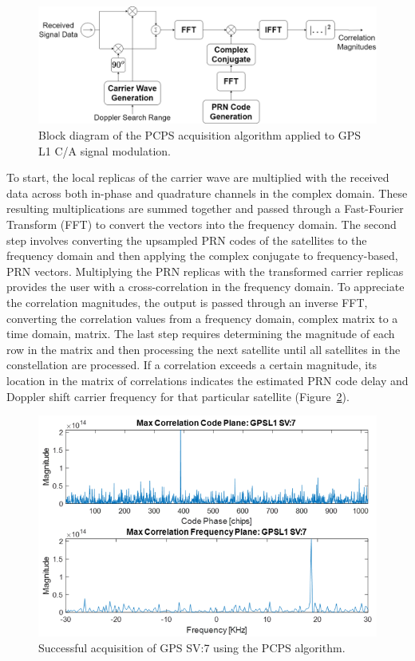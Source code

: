 \begin{figure}[!ht]
    \centering
    \includegraphics[width=\linewidth]{Figures/PCPS.drawio.png}
    \caption{Block diagram of the PCPS acquisition algorithm applied to GPS L1 C/A signal modulation.}\label{fig:PCPS}
\end{figure}

To start, the local replicas of the carrier wave are multiplied with the received data across both in-phase and quadrature channels in the complex domain. These resulting multiplications are summed together and passed through a Fast-Fourier Transform (FFT) to convert the vectors into the frequency domain. The second step involves converting the upsampled PRN codes of the satellites to the frequency domain and then applying the complex conjugate to frequency-based, PRN vectors. Multiplying the PRN replicas with the transformed carrier replicas provides the user with a cross-correlation in the frequency domain. To appreciate the correlation magnitudes, the output is passed through an inverse FFT, converting the correlation values from a frequency domain, complex matrix to a time domain, matrix. The last step requires determining the magnitude of each row in the matrix and then processing the next satellite until all satellites in the constellation are processed. If a correlation exceeds a certain magnitude, its location in the matrix of correlations indicates the estimated PRN code delay and Doppler shift carrier frequency for that particular satellite (Figure~\ref{fig:acq}). 
\begin{figure}[!ht]
\centering
\includegraphics[width=\linewidth]{Figures/trackingGPS.png}
\caption{Successful acquisition of GPS SV:7 using the PCPS algorithm.}\label{fig:acq}
\end{figure}

